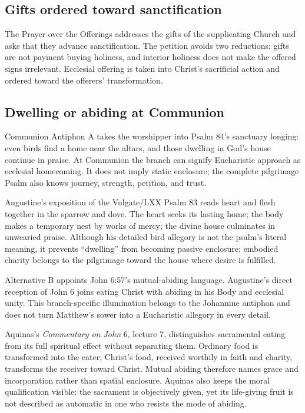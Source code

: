 \begin{deepstudy}
\subsection*{Gifts ordered toward sanctification\enspace{}}

The Prayer over the Offerings addresses the gifts of the supplicating Church and asks that they advance sanctification. The petition avoids two reductions: gifts are not payment buying holiness, and interior holiness does not make the offered signs irrelevant. Ecclesial offering is taken into Christ's sacrificial action and ordered toward the offerers' transformation.

\subsection*{Dwelling or abiding at Communion\enspace{}}

Communion Antiphon A takes the worshipper into Psalm 84's sanctuary longing: even birds find a home near the altars, and those dwelling in God's house continue in praise. At Communion the branch can signify Eucharistic approach as ecclesial homecoming. It does not imply static enclosure; the complete pilgrimage Psalm also knows journey, strength, petition, and trust.

Augustine's exposition of the Vulgate/LXX Psalm 83 reads heart and flesh together in the sparrow and dove. The heart seeks its lasting home; the body makes a temporary nest by works of mercy; the divine house culminates in unwearied praise. Although his detailed bird allegory is not the psalm's literal meaning, it prevents “dwelling” from becoming passive enclosure: embodied charity belongs to the pilgrimage toward the house where desire is fulfilled.

Alternative B appoints John 6:57's mutual-abiding language. Augustine's direct reception of John 6 joins eating Christ with abiding in his Body and ecclesial unity. This branch-specific illumination belongs to the Johannine antiphon and does not turn Matthew's sower into a Eucharistic allegory in every detail.

Aquinas's \emph{Commentary on John} 6, lecture 7, distinguishes sacramental eating from its full spiritual effect without separating them. Ordinary food is transformed into the eater; Christ's food, received worthily in faith and charity, transforms the receiver toward Christ. Mutual abiding therefore names grace and incorporation rather than spatial enclosure. Aquinas also keeps the moral qualification visible: the sacrament is objectively given, yet its life-giving fruit is not described as automatic in one who resists the mode of abiding.


\end{deepstudy}
